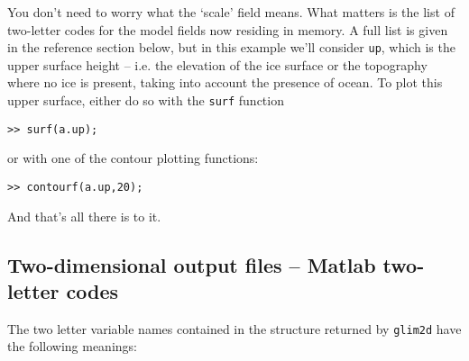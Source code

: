 % 
You don't need to worry what the `scale' field means. What
matters is the list of two-letter codes for the model fields now residing in
memory. A full list is given in the reference section below, but in this
example we'll consider \texttt{up}, which is the upper surface height --
i.e. the elevation of the ice surface or the topography where no ice is
present, taking into account the presence of ocean. To plot this upper
surface, either do so with the \texttt{surf} function
%
\begin{verbatim}
>> surf(a.up);
\end{verbatim}
%
or with one of the contour plotting functions:
%
\begin{verbatim}
>> contourf(a.up,20);
\end{verbatim}
%
And that's all there is to it.
%
\subsection{Two-dimensional output files -- Matlab two-letter codes}
%
The two letter variable names contained in the structure returned by
\texttt{glim2d} have the following meanings:
%
